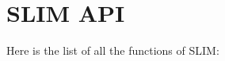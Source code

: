 \section{S\+L\+IM A\+PI}
Here is the list of all the functions of S\+L\+IM\+:\begin{DoxyCompactList}
\item {}
\end{DoxyCompactList}
